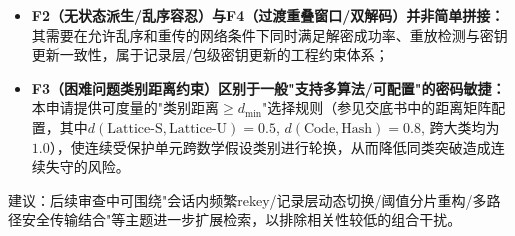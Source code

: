\documentclass[12pt,a4paper]{article}
\begin{document}
\begin{itemize}[leftmargin=2em]
    \item \textbf{F2（无状态派生/乱序容忍）与F4（过渡重叠窗口/双解码）并非简单拼接：}其需要在允许乱序和重传的网络条件下同时满足解密成功率、重放检测与密钥更新一致性，属于记录层/包级密钥更新的工程约束体系；
    \item \textbf{F3（困难问题类别距离约束）区别于一般"支持多算法/可配置"的密码敏捷：}本申请提供可度量的"类别距离$\ge d_{\min}$"选择规则（参见交底书中的距离矩阵配置，其中$d(\text{Lattice-S}, \text{Lattice-U})=0.5$, $d(\text{Code}, \text{Hash})=0.8$, 跨大类均为$1.0$），使连续受保护单元跨数学假设类别进行轮换，从而降低同类突破造成连续失守的风险。
\end{itemize}

建议：后续审查中可围绕"会话内频繁rekey/记录层动态切换/阈值分片重构/多路径安全传输结合"等主题进一步扩展检索，以排除相关性较低的组合干扰。
\end{document}
